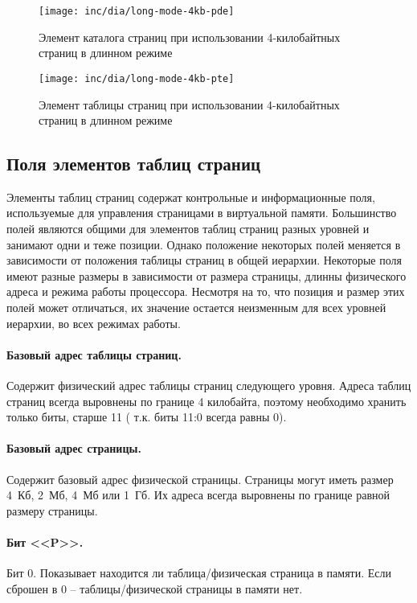 \begin{figure}[ht!]
  \centering
  \texttt{[image: inc/dia/long-mode-4kb-pde]}
  \caption{Элемент каталога страниц при использовании 4-килобайтных страниц в длинном режиме}
  \label{fig:long-mode-4kb-pde}
\end{figure}

\begin{figure}[ht!]
  \centering
  \texttt{[image: inc/dia/long-mode-4kb-pte]}
  \caption{Элемент таблицы страниц при использовании 4-килобайтных страниц в длинном режиме}
  \label{fig:long-mode-4kb-pte}
\end{figure}

\subsection{Поля элементов таблиц страниц}
\label{subsec:page_table_fields}
Элементы таблиц страниц содержат контрольные и информационные поля, используемые для управления
страницами в виртуальной памяти. Большинство полей являются общими для элементов таблиц страниц
разных уровней и занимают одни и теже позиции. Однако положение некоторых полей меняется в
зависимости от положения таблицы страниц в общей иерархии. Некоторые поля имеют разные размеры
в зависимости от размера страницы, длинны физического адреса и режима работы процессора. Несмотря на
то, что позиция и размер этих полей может отличаться, их значение остается неизменным для всех
уровней иерархии, во всех режимах работы.

\paragraph{Базовый адрес таблицы страниц.} Содержит физический адрес таблицы страниц следующего уровня.
Адреса таблиц страниц всегда выровнены по границе 4 килобайта, поэтому необходимо хранить только биты, старше 11 (
т.к. биты 11:0 всегда равны 0).

\paragraph{Базовый адрес страницы.} Содержит базовый адрес физической страницы. Страницы могут иметь размер 4~Кб, 2~Мб,
4~Мб или 1~Гб. Их адреса всегда выровнены по границе равной размеру страницы.

\paragraph{Бит <<P>>.} Бит 0. Показывает находится ли таблица/физическая страница в памяти. Если сброшен в 0 --
таблицы/физической страницы в памяти нет.

